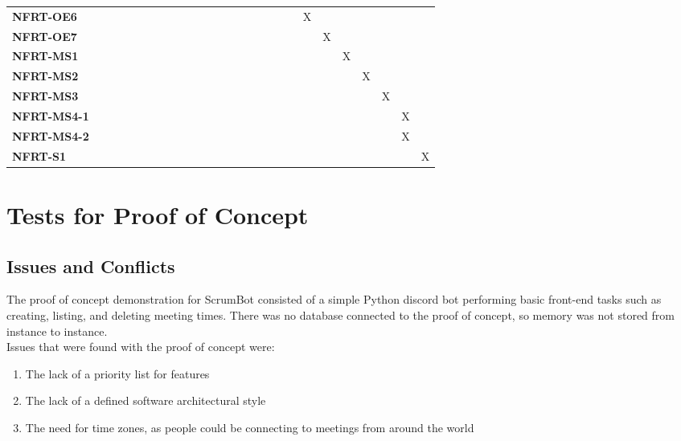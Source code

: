 \documentclass[12pt, titlepage]{article}
\begin{document}
\begin{landscape}
\begin{table}[H]
\begin{adjustbox}{width=\paperwidth}
\begin{tabular}{l|ccccccccccccccccccc}
        \textbf{NFRT-OE6}       & ~ & ~ & ~ & ~ & ~ & ~ & ~ & ~ & ~ & ~ & ~ & ~ & X & ~ & ~ & ~ & ~ & ~ & ~\\
        \textbf{NFRT-OE7}       & ~ & ~ & ~ & ~ & ~ & ~ & ~ & ~ & ~ & ~ & ~ & ~ & ~ & X & ~ & ~ & ~ & ~ & ~\\
        \textbf{NFRT-MS1}       & ~ & ~ & ~ & ~ & ~ & ~ & ~ & ~ & ~ & ~ & ~ & ~ & ~ & ~ & X & ~ & ~ & ~ & ~\\
        \textbf{NFRT-MS2}       & ~ & ~ & ~ & ~ & ~ & ~ & ~ & ~ & ~ & ~ & ~ & ~ & ~ & ~ & ~ & X & ~ & ~ & ~\\
        \textbf{NFRT-MS3}       & ~ & ~ & ~ & ~ & ~ & ~ & ~ & ~ & ~ & ~ & ~ & ~ & ~ & ~ & ~ & ~ & X & ~ & ~\\
        \textbf{NFRT-MS4-1}     & ~ & ~ & ~ & ~ & ~ & ~ & ~ & ~ & ~ & ~ & ~ & ~ & ~ & ~ & ~ & ~ & ~ & X & ~\\
        \textbf{NFRT-MS4-2}     & ~ & ~ & ~ & ~ & ~ & ~ & ~ & ~ & ~ & ~ & ~ & ~ & ~ & ~ & ~ & ~ & ~ & X & ~\\
        \textbf{NFRT-S1}        & ~ & ~ & ~ & ~ & ~ & ~ & ~ & ~ & ~ & ~ & ~ & ~ & ~ & ~ & ~ & ~ & ~ & ~ & X\\
    \end{tabular}
    \end{adjustbox}
    \label{Traceability Matrix: Non-Functional Requirement}
\end{table}
\end{landscape}

\section{Tests for Proof of Concept}

\subsection{Issues and Conflicts}
The proof of concept demonstration for ScrumBot consisted of a simple Python discord bot performing basic front-end tasks such as creating, listing, and deleting meeting times. There was no database connected to the proof of concept, so memory was not stored from instance to instance.\\
\noindent Issues that were found with the proof of concept were:
\begin{enumerate}
    \item The lack of a priority list for features
    \item The lack of a defined software architectural style
    \item The need for time zones, as people could be connecting to meetings from around the world
\end{enumerate}
\end{document}
